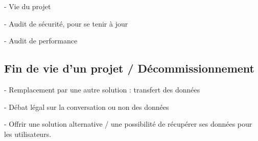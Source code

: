 
- Vie du projet

- Audit de sécurité, pour se tenir à jour

- Audit de performance

\subsection{Fin de vie d'un projet / Décommissionnement}


- Remplacement par une autre solution : transfert des données

- Débat légal sur la conversation ou non des données

- Offrir une solution alternative / une possibilité de récupérer ses données pour les utilisateurs.

